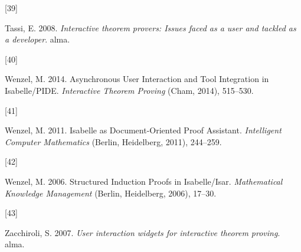 \documentclass[
]{article}
\newlength{\cslhangindent}
\newlength{\csllabelwidth}
\newlength{\cslentryspacingunit} %
\newenvironment{CSLReferences}[2] %
 {%
  \setlength{\parindent}{0pt}
  \ifodd #1
  \let\oldpar\par
  \def\par{\hangindent=\cslhangindent\oldpar}
  \fi
  \setlength{\parskip}{#2\cslentryspacingunit}
 }%
 {}
\newcommand{\CSLLeftMargin}[1]{\parbox[t]{\csllabelwidth}{#1}}
\newcommand{\CSLRightInline}[1]{\parbox[t]{\linewidth - \csllabelwidth}{#1}\break}
\begin{document}
\begin{CSLReferences}{0}{0}
\leavevmode{}%
\CSLLeftMargin{{[}39{]} }
\CSLRightInline{Tassi, E. 2008. \emph{Interactive theorem provers:
Issues faced as a user and tackled as a developer}. alma.}

\leavevmode{}%
\CSLLeftMargin{{[}40{]} }
\CSLRightInline{Wenzel, M. 2014. Asynchronous {User} {Interaction} and
{Tool} {Integration} in {Isabelle}/{PIDE}. \emph{Interactive {Theorem}
{Proving}} (Cham, 2014), 515--530.}

\leavevmode{}%
\CSLLeftMargin{{[}41{]} }
\CSLRightInline{Wenzel, M. 2011. Isabelle as {Document}-{Oriented}
{Proof} {Assistant}. \emph{Intelligent {Computer} {Mathematics}}
(Berlin, Heidelberg, 2011), 244--259.}

\leavevmode{}%
\CSLLeftMargin{{[}42{]} }
\CSLRightInline{Wenzel, M. 2006. Structured {Induction} {Proofs} in
{Isabelle}/{Isar}. \emph{Mathematical {Knowledge} {Management}} (Berlin,
Heidelberg, 2006), 17--30.}

\leavevmode{}%
\CSLLeftMargin{{[}43{]} }
\CSLRightInline{Zacchiroli, S. 2007. \emph{User interaction widgets for
interactive theorem proving}. alma.}

\end{CSLReferences}
\end{document}
